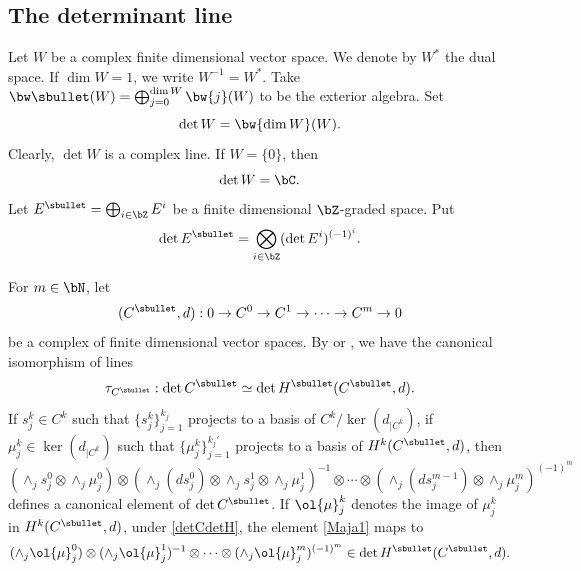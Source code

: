 \subsection{The determinant line}\label{sDL}
Let $W$ be a complex finite dimensional vector space. We denote by
$W^*$ the dual space. If $\dim W=1$, we write $W^{-1}=W^{*}$. Take
$\bw\sbullet(W)=\bigoplus_{j=0}^{\dim W}\bw{j}(W)$ to be the exterior algebra. Set
\begin{equation*}
\det W =\bw{\dim W} (W).
\end{equation*}
Clearly, $\det W$ is a complex line. If $W=\{0\}$, then
\begin{equation*}
\det
W=\bC.
\end{equation*}
Let $E^{\sbullet}=\bigoplus_{i\in \bZ} E^{i}$ be a finite dimensional $\bZ$-graded
space. Put
\begin{equation*}
\det E^{\sbullet}= \bigotimes_{i\in \bZ} (\det E^{i})^{(-1)^{i}}.
\end{equation*}

For $m\in \bN$, let
\begin{equation*}
(C^{\sbullet},d): 0\to C^{0}\to C^{1}\to\cdots\to C^{m}\to 0
\end{equation*}
be a complex of finite dimensional vector
spaces. By \cite{KM76} or
\cite[(1.5)]{BGS1}, we
have the canonical isomorphism of lines
\begin{equation}\label{detCdetH}
\tau_{C^{\sbullet}}: \det C^{\sbullet}\simeq \det H^{\sbullet}(C^{\sbullet},d).
\end{equation}
If $s_{j}^{k}\in C^{k}$ such that $\{s_{j}^{k}\}_{j=1}^{k_{j}}$ projects to a basis of
$C^{k}/\ker (d_{|C^{k}})$, if $\mu_{j}^{k}\in \ker( d_{|C^{k}})$ such that
$\{\mu_{j}^{k}\}_{j=1}^{k_{j}'}$ projects to a basis of
$H^{k}(C^\sbullet,d)$,
then
\begin{equation}\label{Maja1}
(\wedge_{j} s^{0}_{j}\otimes \wedge_{j}\mu^{0}_{j})\otimes
(\wedge_{j} (ds^{0}_{j})\otimes
\wedge_{j}s^{1}_{j} \otimes \wedge_{j}\mu^{1}_{j})^{-1} \otimes\cdots \otimes(\wedge_{j}
(ds^{m-1}_{j})\otimes \wedge_{j}\mu^{m}_{j})^{(-1)^m}
\end{equation}
defines a canonical element of $\det C^\sbullet$.
If $\ol{\mu}_{j}^{k}$ denotes the image of $\mu_{j}^{k}$ in $H^{k}(C^{\sbullet},d)$, under
\eqref{detCdetH}, the element \eqref{Maja1} maps to
\begin{equation}\label{Maja11}
( \wedge_{j}\ol{\mu}^{0}_{j})\otimes
( \wedge_{j}\ol{\mu}^{1}_{j})^{-1} \otimes\cdots \otimes(
\wedge_{j}\ol{\mu}^{m}_{j})^{(-1)^m}\in \det
H^{\sbullet}(C^{\sbullet},d).
\end{equation}

